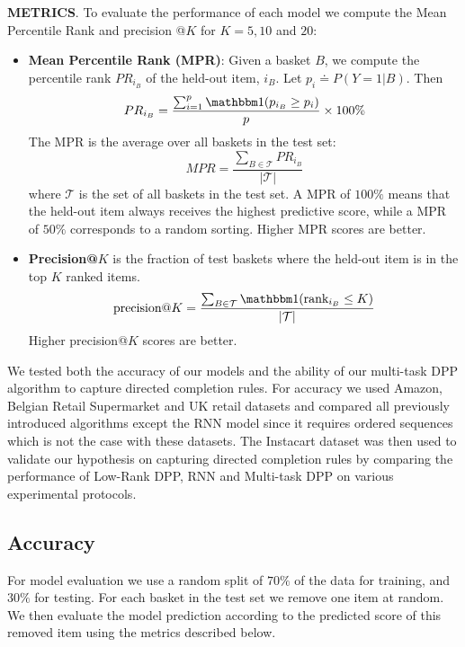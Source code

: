 \noindent
\textbf{METRICS}. To evaluate the performance of each model we compute the Mean
Percentile Rank and precision @$K$ for $K=5, 10$ and $20$:
\begin{itemize}
\item \textbf{Mean Percentile Rank (MPR)}: Given a basket $B$, we compute the
percentile rank $PR_{i_B}$ of the held-out item, $i_B$. Let
$p_i \doteq P(Y=1|B)$.  Then 
\begin{equation}
PR_{i_B} = \frac{\sum_{i=1}^p \one(p_{i_B} \geq p_i)}{p} \times 100\%
\end{equation}
The MPR is the average over all baskets in the test set:
\begin{equation}
MPR = \frac{\sum_{B \in \mathcal{T}} PR_{i_B}}{|\mathcal{T}|}
\end{equation}
where $\mathcal{T}$ is the set of all baskets in the test set. A MPR of $100\%$
means that the held-out item always receives the highest predictive score, while
a MPR of $50 \%$ corresponds to a random sorting. Higher MPR scores are better.
\item \textbf{Precision@$K$} is the fraction of test baskets where the held-out
item is in the top $K$ ranked items. 
\begin{equation}
\text{precision@}K = \frac{\sum_{B \in \mathcal{T}} \one(\text{rank}_{i_B} \leq K)}{|\mathcal{T}|}
\end{equation}
Higher precision@$K$ scores are better. 
\end{itemize}

We tested both the accuracy of our models and the ability of our multi-task DPP algorithm to capture directed completion rules. 
For accuracy we used Amazon, Belgian Retail Supermarket and UK retail datasets and compared all previously introduced algorithms 
except the RNN model since it requires ordered sequences which is not the case with these datasets. The Instacart dataset was then 
used to validate our hypothesis on capturing directed completion rules by comparing the performance of Low-Rank DPP, RNN and Multi-task DPP
on various experimental protocols.

\subsection{Accuracy}
For model evaluation we use a random split
of $70\%$ of the data for training, and $30\%$ for testing. For each basket in
the test set we remove one item at random. We then evaluate the model prediction
according to the predicted score of this removed item using the metrics
described below. 


